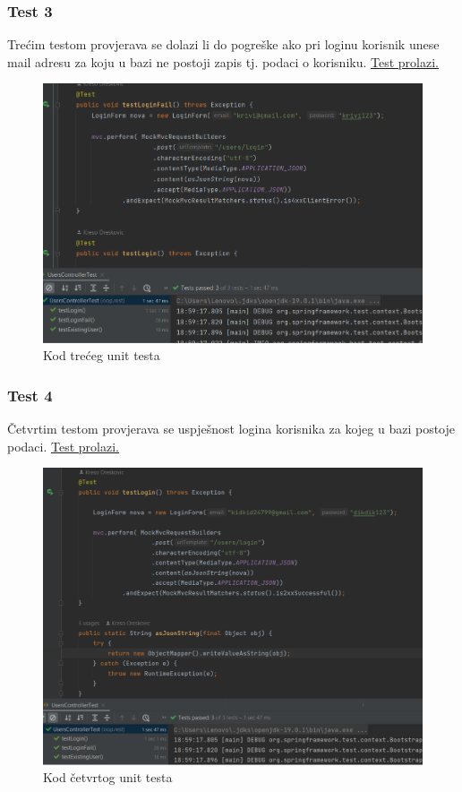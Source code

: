                 \subsubsection{Test 3}
                Trećim testom provjerava se dolazi li do pogreške ako pri loginu korisnik unese mail adresu za koju u bazi ne postoji zapis tj. podaci o korisniku. \underline{Test prolazi.}

                \begin{figure}[H]
				\includegraphics[scale=0.8]{slike/unit3.png}
				\centering
				\caption{Kod trećeg unit testa}
				\label{fig:unit3}
			\end{figure}

                \eject
            
                \subsubsection{Test 4}
                Četvrtim testom provjerava se uspješnost logina korisnika za kojeg u bazi postoje podaci. \underline{Test prolazi.}

                \begin{figure}[H]
				\includegraphics[]{slike/unit4.png}
				\centering
				\caption{Kod četvrtog unit testa}
				\label{fig:unit4}
			\end{figure}

